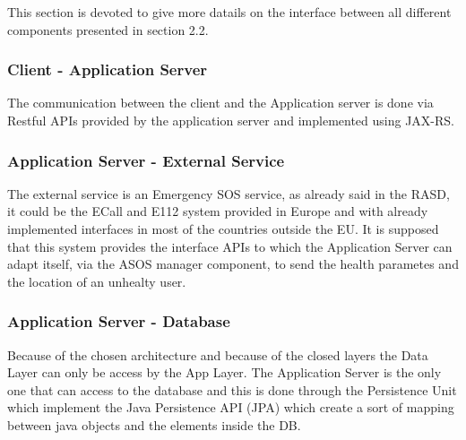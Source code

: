 This section is devoted to give more datails on the interface between all different components presented in section 2.2.

\subsubsection{Client - Application Server}
The communication between the client and the Application server is done via Restful APIs provided by the application server and  implemented using JAX-RS.

\subsubsection{Application Server - External Service}
The external service is an Emergency SOS service, as already said in the RASD, it could be the ECall and E112 system provided in Europe and with already implemented interfaces in most of the countries outside the EU. It is supposed that this system provides the interface APIs to which the Application Server can adapt itself, via the ASOS manager component, to send the health parametes and the location of an unhealty user.

\subsubsection{Application Server - Database}
Because of the chosen architecture and because of the closed layers the Data Layer can only be access by the App Layer. The Application Server is the only one that can access to the database and this is done through the Persistence Unit which implement the Java Persistence API (JPA) which create a sort of mapping between java objects and the elements inside the DB.